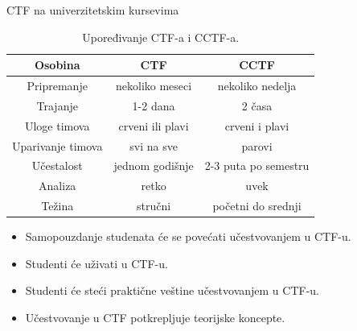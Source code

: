 \documentclass{beamer}
\begin{document}
\begin{frame}[fragile]
\begin{columns}[T]
\begin{column}{.46\textwidth}
            \begin{block}{CTF na univerzitetskim kursevima}
                \begin{table}[!h]
                    \centering
                    \begin{tabular}{|c|c|c|}
                        \hline
                        \textbf{Osobina} & \textbf{CTF} & \textbf{CCTF} \\
                        \hline
                        \hline
                        Pripremanje & nekoliko meseci & nekoliko nedelja \\
                        Trajanje & 1-2 dana & 2 časa \\
                        Uloge timova & crveni ili plavi & crveni i plavi \\
                        Uparivanje timova & svi na sve & parovi \\
                        Učestalost & jednom godišnje & 2-3 puta po semestru \\
                        Analiza & retko & uvek \\
                        Težina & stručni & početni do srednji \\
                        \hline
                    \end{tabular}
                    \caption{Upoređivanje CTF-a i CCTF-a.}\label{tab:cctf}
                \end{table}
                \begin{itemize}
                    \item Samopouzdanje studenata će se povećati učestvovanjem
                        u CTF-u.
                    \item Studenti će uživati u CTF-u.
                    \item Studenti će steći praktične veštine učestvovanjem
                        u CTF-u.
                    \item Učestvovanje u CTF potkrepljuje teorijske koncepte.
                \end{itemize}
            \end{block}


        \end{column}

    \end{columns}

\end{frame}
\end{document}
